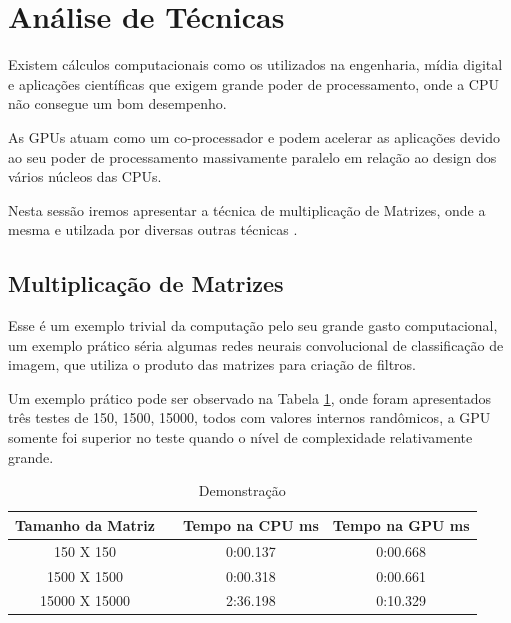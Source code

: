 \documentclass[conference]{IEEEtran}
\begin{document}
	
	\section{An\'alise de T\'ecnicas}
	
	Existem c\'alculos computacionais como os utilizados na engenharia, m\'idia digital e aplica\c{c}\~oes cient\'ificas que exigem grande poder de processamento, onde a CPU n\~ao consegue um bom desempenho. 
	
	As GPUs atuam como um co-processador e podem acelerar as aplica\c{c}\~oes devido ao seu poder de processamento massivamente paralelo em rela\c{c}\~ao ao design dos v\'arios n\'ucleos das CPUs.
	
	Nesta sess\~ao iremos apresentar a técnica de multiplicação de Matrizes, onde a mesma e utilzada por diversas outras técnicas \cite{IEEEhowto:3}.
	
	
	\subsection{Multiplica\c{c}\~ao de Matrizes}
	
	Esse \'e um exemplo trivial da computa\c{c}\~ao pelo seu grande gasto computacional, um exemplo pr\'atico s\'eria algumas redes neurais convolucional de classifica\c{c}\~ao de imagem, que utiliza o produto das matrizes para cria\c{c}\~ao de filtros.
	
	Um exemplo pr\'atico pode ser observado na Tabela \ref{an:mult}, onde foram apresentados tr\^es testes de 150\texttwosuperior, 1500\texttwosuperior , 15000\texttwosuperior, todos com valores internos rand\^omicos, a GPU somente foi superior no teste quando o n\'ivel de complexidade relativamente grande.
	
	\begin{table}[H]
		\centering
		\caption{Demonstração}
		\label{an:mult}
		\begin{tabular}{clcc}
			\hline
			\multicolumn{1}{l}{\textbf{Tamanho da Matriz}} &  & \multicolumn{1}{l}{\textbf{Tempo na CPU ms}} & \multicolumn{1}{l}{\textbf{Tempo na GPU ms}} \\ \hline
			150 X 150                                      &  & 0:00.137                                     & 0:00.668                                     \\
			1500 X 1500                                    &  & 0:00.318                                     & 0:00.661                                     \\
			15000 X 15000                                  &  & 2:36.198                                     & 0:10.329                                     
		                                \\ \hline
		\end{tabular}
	\end{table}
	
\end{document}
